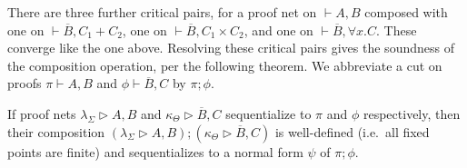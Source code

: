 \documentclass[a4paper,UKenglish]{lipics-v2019}
\newcommand\+{+}
\renewcommand\*{\times}
\newcommand\dual[1]{\overline{#1}}
\newcommand\seq[2]{{\vdash}#1,#2}
\newcommand\prf[3]{#1\vdash\!#2,#3}
\newcommand\net[3]{#1\triangleright #2,#3}
\newcommand\comp{\mathbin;}
\begin{document}
\noindent
There are three further critical pairs, for a proof net on $\seq AB$ composed with one on $\seq {\dual B}{C_1{\+}C_2}$, one on $\seq {\dual B}{C_1{\*}C_2}$, and one on $\seq {\dual B}{\forall x.C}$. These converge like the one above.
%
Resolving these critical pairs gives the soundness of the composition operation, per the following theorem. We abbreviate a cut on proofs $\prf\pi AB$ and $\prf\phi{\dual B}C$ by $\pi\comp\phi$.

\begin{theorem}
\label{thm:composition}
If proof nets $\net{\lambda_\Sigma}AB$ and $\net{\kappa_\Theta}{\dual B}C$ sequentialize to $\pi$ and $\phi$ respectively, then their composition $(\net{\lambda_\Sigma}AB)\comp(\net{\kappa_\Theta}{\dual B}C)$ is well-defined (i.e.\ all fixed points are finite) and sequentializes to a normal form $\psi$ of $\pi\comp\phi$.
\end{theorem}

\newcommand\yA{2.7}
\newcommand\yB{1.65}
\newcommand\yC{1.05}
\end{document}
